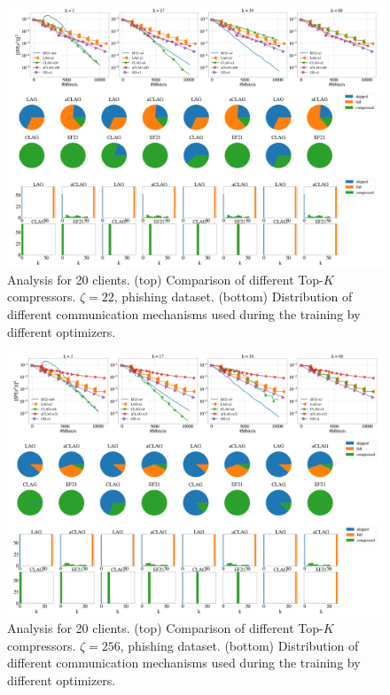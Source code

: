 \documentclass[nohyperref]{article}
\theoremstyle{plain}
\theoremstyle{definition}
\theoremstyle{remark}
\begin{document}
\begin{figure}[!h]
	\centering
	\includegraphics[width=\textwidth]{plots/adaptive/old_7.png}
	\caption{Analysis for 20 clients. (top) Comparison of different  Top-$K$ compressors. $\zeta = 22$, phishing dataset. (bottom) Distribution  of different communication mechanisms used during the training by different optimizers.}
	\label{fig:anna-100-nodes-grads_main}
\end{figure}

\begin{figure}[!h]
	\centering
	\includegraphics[width=\textwidth]{plots/adaptive/old_9.png}
	\caption{Analysis for 20 clients. (top) Comparison of different  Top-$K$ compressors. $\zeta = 256$, phishing dataset. (bottom) Distribution  of different communication mechanisms used during the training by different optimizers.}
	\label{fig:anna-100-nodes-grads_main}
\end{figure}
\end{document}
